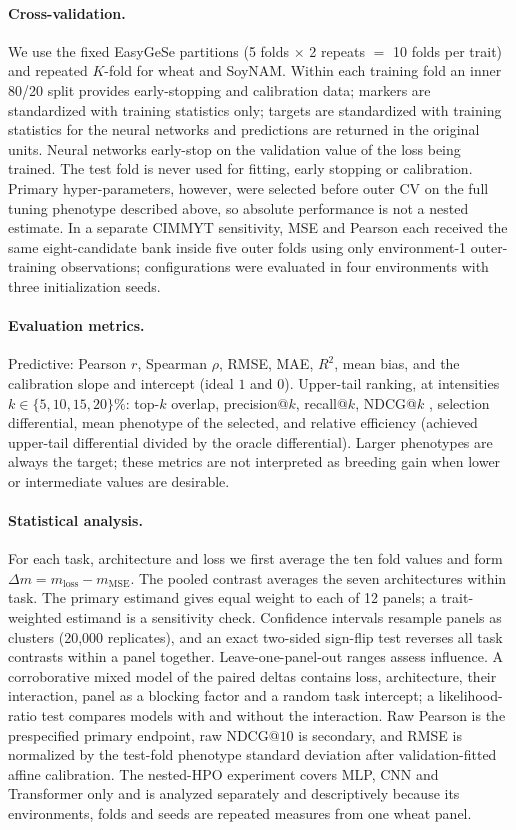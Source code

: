 \documentclass[11pt]{article}
\theoremstyle{plain}
\theoremstyle{remark}
\begin{document}
\paragraph{Cross-validation.} We use the fixed EasyGeSe partitions (5 folds
$\times$ 2 repeats $=$ 10 folds per trait) and repeated $K$-fold for wheat and
SoyNAM. Within each training fold an inner 80/20 split provides early-stopping and
calibration data; markers are standardized with training statistics only;
targets are standardized with training statistics for the neural networks and
predictions are returned in the original units. Neural networks early-stop on the
validation value of the loss being trained. The test fold is never used for
fitting, early stopping or calibration. Primary hyper-parameters, however, were
selected before outer CV on the full tuning phenotype described above, so
absolute performance is not a nested estimate. In a separate CIMMYT sensitivity,
MSE and Pearson each received the same eight-candidate bank inside five outer
folds using only environment-1 outer-training observations; configurations were
evaluated in four environments with three initialization seeds.

\paragraph{Evaluation metrics.} Predictive: Pearson $r$, Spearman $\rho$, RMSE,
MAE, $R^2$, mean bias, and the calibration slope and intercept (ideal $1$ and
$0$). Upper-tail ranking, at intensities $k\in\{5,10,15,20\}\%$: top-$k$ overlap,
precision@$k$, recall@$k$, NDCG@$k$ \citep{jarvelin2002ndcg}, selection
differential, mean phenotype of the selected, and relative efficiency (achieved
upper-tail differential divided by the oracle differential). Larger phenotypes
are always the target; these metrics are not interpreted as breeding gain when
lower or intermediate values are desirable.

\paragraph{Statistical analysis.} For each task, architecture and loss we first
average the ten fold values and form
$\Delta m=m_{\mathrm{loss}}-m_{\mathrm{MSE}}$. The pooled contrast averages the
seven architectures within task. The primary estimand gives equal weight to each
of 12 panels; a trait-weighted estimand is a sensitivity check. Confidence
intervals resample panels as clusters (20,000 replicates), and an exact two-sided
sign-flip test reverses all task contrasts within a panel together.
Leave-one-panel-out ranges assess influence. A corroborative mixed model of the
paired deltas contains loss, architecture, their interaction, panel as a blocking
factor and a random task intercept; a likelihood-ratio test compares models with
and without the interaction. Raw Pearson is the prespecified primary endpoint,
raw NDCG@$10$ is secondary, and RMSE is normalized by the test-fold phenotype
standard deviation after validation-fitted affine calibration. The nested-HPO
experiment covers MLP, CNN and Transformer only and is analyzed separately and descriptively because its environments,
folds and seeds are repeated measures from one wheat panel.
\end{document}
